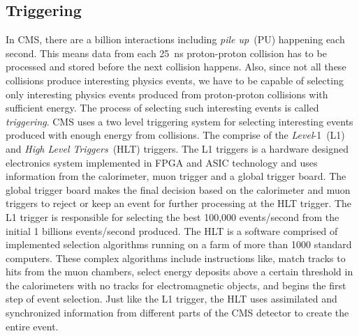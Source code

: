 \subsection{Triggering}
In CMS, there are a billion interactions including \textit{pile up}~(PU) happening each second. This means data from each 25~ns proton-proton collision has to be processed and stored before the next collision happens. Also, since not all these collisions produce 
interesting physics events, we have to be capable of selecting only interesting physics events produced from proton-proton collisions with sufficient  energy. The process of selecting such interesting events is called \textit{triggering}.
CMS uses a two level triggering system for selecting interesting events produced with enough energy from collisions.
The comprise of the \textit{Level}-1~(L1) and \textit{High Level Triggers}~(HLT) triggers.
\newline
The L1 triggers is a hardware designed electronics system implemented in FPGA and ASIC technology and uses information from the calorimeter, muon trigger and a global trigger board. The global trigger board makes the final decision based on the calorimeter and muon triggers to reject or keep an event for further processing at the HLT trigger. The L1 trigger is responsible for selecting the best 100,000 events/second from the initial 1 billions events/second produced. %
\newline
The HLT is a software comprised of implemented selection algorithms running on a farm of more than 1000 standard computers. %
These complex algorithms include instructions like, match tracks to hits from the muon chambers, select energy deposits above a certain threshold in the calorimeters with no tracks for electromagnetic objects, and begins the first step of event selection. Just like the L1 trigger, the HLT  uses assimilated and synchronized information from different parts of the CMS detector to create the entire event. 
